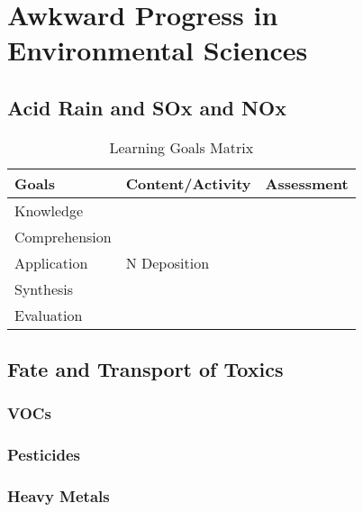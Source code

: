 \documentclass{tufte-book}\usepackage[]{graphicx}\usepackage[]{xcolor}
\begin{document}
\part{Awkward Progress in Environmental Sciences}




\chapter{Acid Rain and SOx and NOx}

\begin{table}[htbp]
	\centering
	\caption{Learning Goals Matrix}
	\label{tab:LearningGoalsMatrix}
		\begin{tabular}{|l|p{4cm}|l|}\hline
Goals 					& Content/Activity				& Assessment \\ \hline\hline
Knowledge				&													&							\\
Comprehension		&													&							\\
Application			&	N Deposition						&							\\
Synthesis				&													&							\\
Evaluation			&													&							\\ \hline
		\end{tabular}

\end{table}

\chapter{Fate and Transport of Toxics}

\section{VOCs}

\section{Pesticides}

\section{Heavy Metals}
\end{document}
